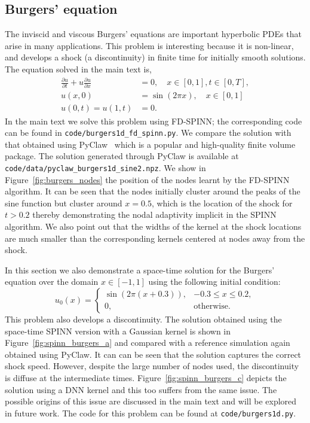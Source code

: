 \documentclass[12pt]{article}
\newcommand{\code}[1]{\lstinline{#1}}
\begin{document}
\subsection{Burgers' equation}
The inviscid and viscous Burgers' equations are important hyperbolic PDEs that arise in many applications.  This problem is interesting because it is non-linear, and develops a shock (a discontinuity) in finite time for initially smooth solutions.  The equation solved in the main text is,
\begin{displaymath}
\begin{split}
\frac{\partial u}{\partial t} + u \frac{\partial u}{\partial x} &= 0,  \quad x \in [0, 1], t \in [0, T],\\
u(x, 0) &= \sin(2 \pi x),  \quad x \in [0, 1]\\
u(0, t) = u(1, t) &= 0.
\end{split}
\end{displaymath}
In the main text we solve this problem using FD-SPINN; the corresponding code can be found in \code{code/burgers1d_fd_spinn.py}.  We compare the solution with that obtained using PyClaw~\cite{pyclaw} which is a popular and high-quality finite volume package.  The solution generated through PyClaw is  available at \code{code/data/pyclaw_burgers1d_sine2.npz}.
We show in Figure~\ref{fig:burgers_nodes} the position of the nodes learnt by the FD-SPINN algorithm.  It can be seen that the nodes initially cluster around the peaks of the sine function but cluster around $x=0.5$, which is the location of the shock for $t> 0.2$ thereby demonstrating the nodal adaptivity implicit in the SPINN algorithm.  We also point out that the widths of the kernel at the shock locations are much smaller than the corresponding kernels centered at nodes away from the shock.

In this section we also demonstrate a space-time solution for the Burgers' equation over the domain $x \in [-1, 1]$ using the following initial condition:
\begin{displaymath}
u_0(x) = \begin{cases}
\sin(2\pi(x + 0.3)), & -0.3 \le x \le 0.2,\\
0, & \text{otherwise}.
\end{cases}
\end{displaymath}
This problem also develops a discontinuity. The solution obtained using the space-time SPINN version with a Gaussian kernel is shown in Figure~\ref{fig:spinn_burgers_a} and compared with a reference simulation again obtained using PyClaw.  It can  can be seen that the solution captures the correct shock speed.  However, despite the large number of nodes used, the discontinuity is diffuse at the intermediate times.
Figure~\ref{fig:spinn_burgers_c} depicts the solution using a DNN kernel and this too suffers from the same issue.  The possible origins of this issue are discussed in the main text and will be explored in future work. The code for this problem can be found at \code{code/burgers1d.py}.
\end{document}
